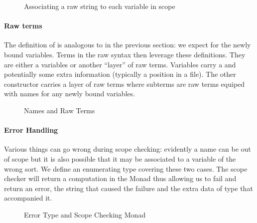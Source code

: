 \begin{figure}[h]
\begin{minipage}[t]{0.6\textwidth}
\end{minipage}
\begin{minipage}[t]{0.3\textwidth}
\end{minipage}
\caption{Associating a raw string to each variable in scope}
\end{figure}

\paragraph{Raw terms}
The definition of  is analogous to  in the
previous section: we expect  for the newly bound
variables. Terms in the raw syntax then leverage these
definitions. They are either a variables or another ``layer'' of raw
terms. Variables  carry a  and potentially some
extra information  (typically a position in a file). The other
constructor  carries a layer of raw terms where subterms are
raw terms equiped with names for any newly bound variables.

\begin{figure}[h]
\caption{Names and Raw Terms}
\end{figure}

\paragraph{Error Handling} Various things can go wrong during scope checking:
evidently a name can be out of scope but it is also possible that it may be
associated to a variable of the wrong sort. We define an enumerating type
covering these two cases. The scope checker will return a computation in the
Monad  thus allowing us to fail and return an error, the string that
caused the failure and the extra data of type  that accompanied it.

\begin{figure}[h]
\begin{minipage}[t]{0.5\textwidth}
\end{minipage}
\begin{minipage}[t]{0.4\textwidth}
\end{minipage}
\caption{Error Type and Scope Checking Monad}\label{fig:scopemonad}
\end{figure}


